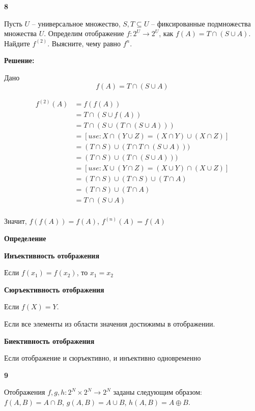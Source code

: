 \documentclass{article}
\begin{document}
\newpage

\textbf{8}

Пусть $U$ -- универсальное множество, $S, T \subseteq U$ -- фиксированные подмножества множества $U$. Определим отображение $f: 2^U \rightarrow 2^U$, как $f(A) = T \cap (S \cup A)$. Найдите $f^{(2)}$. Выясните, чему равно $f^{n}$.

\textbf{Решение:}

Дано
$$f(A) = T \cap (S \cup A)$$

\begin{equation} 
\begin{split}
f^{(2)}(A) &= f(f(A)) \\
&=  T \cap (S \cup f(A)) \\
&= T \cap (S \cup  (T \cap (S \cup A))   ) \\
&= [use: X \cap (Y \cup Z) = (X \cap Y) \cup (X \cap Z) ] \\
&= (T \cap S) \cup  (T \cap T \cap (S \cup A))   ) \\
&= (T \cap S) \cup  (T \cap (S \cup A))   ) \\
&= [use: X \cup (Y \cap Z) = (X \cup Y) \cap (X \cup Z) ] \\
&= (T \cap S) \cup  (T \cap S) \cup (T \cap A)   \\
&= (T \cap S) \cup (T \cap A)   \\
&=  T \cap (S \cup A) \\
\end{split}
\end{equation}

Значит,  $f(f(A)) = f(A)$, $f^{(n)}(A) = f(A)$

\newpage


\textbf {Определение}

\textbf{Инъективность отображения}

Если $f(x_1) = f(x_2)$, то $x_1 = x_2$

\textbf{Сюръективность отображения}

Если $f(X) = Y$.

Если все элементы из области значения достижимы в отображении.

\textbf{Биективность отображения}

Если отображение и сюръективно, и инъективно одновременно


\bigskip

\textbf{9}

Отображения $f, g, h: 2^N \times 2 ^ N \rightarrow 2^N$ заданы следующим образом: $f(A, B) = A \cap B$, $g(A, B) = A \cup B$, $h(A, B) = A \oplus B$.
\end{document}
